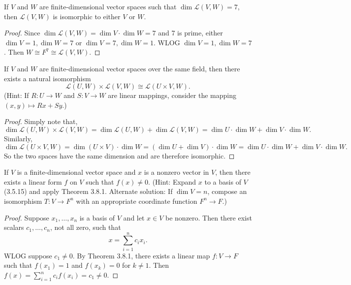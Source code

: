 \begin{tcolorbox}[title=Exercise 10, breakable]
    If $V$ and $W$ are finite-dimensional vector spaces such that 
    $\dim \mathcal{L}(V, W) = 7$, then $\mathcal{L}(V, W)$ is isomorphic to either $V$ or $W$.
\end{tcolorbox}

\begin{proof}
    Since $\dim \mathcal{L}(V, W) = \dim V \cdot \dim W = 7$ and 7 is prime,
    either $\dim V = 1, \dim W = 7$ or $\dim V = 7, \dim W = 1$.
    WLOG $\dim V = 1, \dim W = 7$.
    Then $W \cong F^7 \cong \mathcal{L}(V, W)$.
\end{proof}

\begin{tcolorbox}[title=Exercise 11, breakable]
    If $V$ and $W$ are finite-dimensional vector spaces over the same field, then 
    there exists a natural isomorphism
    \[\mathcal{L}(U, W) \times \mathcal{L}(V, W) \cong \mathcal{L}(U \times V, W).\]
    (Hint: If $R : U \to W$ and $S : V \to W$ are linear mappings, consider 
    the mapping $(x, y) \mapsto Rx + Sy$.)
\end{tcolorbox}

\begin{proof}
    Simply note that,
    \[\dim \mathcal{L}(U, W) \times \mathcal{L}(V, W) = \dim \mathcal{L}(U, W) + \dim \mathcal{L}(V, W) = \dim U \cdot \dim W + \dim V \cdot \dim W.\]
    Similarly,
    \[\dim \mathcal{L}(U \times V, W) = \dim(U \times V) \cdot \dim W = (\dim U + \dim V) \cdot \dim W = \dim U \cdot \dim W + \dim V \cdot \dim W.\]
    So the two spaces have the same dimension and are therefore isomorphic.
\end{proof}

\begin{tcolorbox}[title=Exercise 12, breakable]
    If $V$ is a finite-dimensional vector space and $x$ is a nonzero vector in $V$, 
    then there exists a linear form $f$ on $V$ such that $f(x) \ne 0$. (Hint:
    Expand $x$ to a basis of $V$ (3.5.15) and apply Theorem 3.8.1. Alternate 
    solution: If $\dim V = n$, compose an isomorphism $T : V \to F^n$ with an 
    appropriate coordinate function $F^n \to F$.)
\end{tcolorbox}

\begin{proof}
    Suppose $x_1, \ldots, x_n$ is a basis of $V$ and let $x \in V$ be nonzero.
    Then there exist scalars $c_1, \ldots, c_n$, not all zero, such that 
    \[x = \sum_{i=1}^n c_i x_i.\]
    WLOG suppose $c_1 \ne 0$.
    By Theorem 3.8.1, there exists a linear map $f : V \to F$ such that $f(x_1) = 1$ 
    and $f(x_k) = 0$ for $k \ne 1$.
    Then $f(x) = \sum_{i=1}^n c_i f(x_i) = c_1 \ne 0$.
\end{proof}


